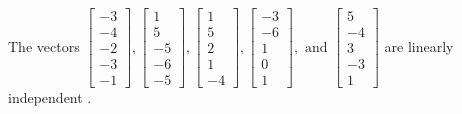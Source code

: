 \begin{exercise}
\begin{exerciseStatement}
  \end{exerciseStatement}
  \begin{exerciseAnswer}
   The vectors \(\left[\begin{array}{r}
-3 \\
-4 \\
-2 \\
-3 \\
-1
\end{array}\right] , \left[\begin{array}{r}
1 \\
5 \\
-5 \\
-6 \\
-5
\end{array}\right] , \left[\begin{array}{r}
1 \\
5 \\
2 \\
1 \\
-4
\end{array}\right] , \left[\begin{array}{r}
-3 \\
-6 \\
1 \\
0 \\
1
\end{array}\right] , \text{ and } \left[\begin{array}{r}
5 \\
-4 \\
3 \\
-3 \\
1
\end{array}\right]\) are 
  	 linearly independent  .
  


  \end{exerciseAnswer}
\end{exercise}